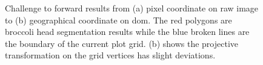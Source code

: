 \begin{figure}[htb!]
  \begin{center}
  \end{center}
  \caption[Challenge to forward results from pixel coordinate to geographical coordinate]{
    Challenge to forward results from (a) pixel coordinate on raw image to (b) geographical coordinate on \gls{dom}. The red polygons are broccoli head segmentation results while the blue broken lines are the boundary of the current plot grid. (b) shows the projective transformation on the grid vertices has slight deviations.
  }
  \label{fig:xrs1}
\end{figure}